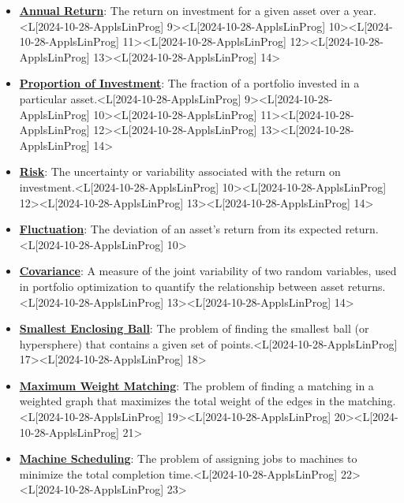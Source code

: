 \documentclass{article}%
\begin{document}
\begin{itemize}[[leftmargin=*]]
\item \href{https://www.math.purdue.edu/~yipn/421/2024-10-28-ApplsLinProg.pdf#page=9}{\textbf{Annual Return}}: The return on investment for a given asset over a year.<L[2024-10-28-ApplsLinProg] 9><L[2024-10-28-ApplsLinProg] 10><L[2024-10-28-ApplsLinProg] 11><L[2024-10-28-ApplsLinProg] 12><L[2024-10-28-ApplsLinProg] 13><L[2024-10-28-ApplsLinProg] 14>%
\item \href{https://www.math.purdue.edu/~yipn/421/2024-10-28-ApplsLinProg.pdf#page=9}{\textbf{Proportion of Investment}}: The fraction of a portfolio invested in a particular asset.<L[2024-10-28-ApplsLinProg] 9><L[2024-10-28-ApplsLinProg] 10><L[2024-10-28-ApplsLinProg] 11><L[2024-10-28-ApplsLinProg] 12><L[2024-10-28-ApplsLinProg] 13><L[2024-10-28-ApplsLinProg] 14>%
\item \href{https://www.math.purdue.edu/~yipn/421/2024-10-28-ApplsLinProg.pdf#page=10}{\textbf{Risk}}: The uncertainty or variability associated with the return on investment.<L[2024-10-28-ApplsLinProg] 10><L[2024-10-28-ApplsLinProg] 12><L[2024-10-28-ApplsLinProg] 13><L[2024-10-28-ApplsLinProg] 14>%
\item \href{https://www.math.purdue.edu/~yipn/421/2024-10-28-ApplsLinProg.pdf#page=10}{\textbf{Fluctuation}}: The deviation of an asset's return from its expected return.<L[2024-10-28-ApplsLinProg] 10>%
\item \href{https://www.math.purdue.edu/~yipn/421/2024-10-28-ApplsLinProg.pdf#page=13}{\textbf{Covariance}}: A measure of the joint variability of two random variables, used in portfolio optimization to quantify the relationship between asset returns.<L[2024-10-28-ApplsLinProg] 13><L[2024-10-28-ApplsLinProg] 14>%
\item \href{https://www.math.purdue.edu/~yipn/421/2024-10-28-ApplsLinProg.pdf#page=17}{\textbf{Smallest Enclosing Ball}}: The problem of finding the smallest ball (or hypersphere) that contains a given set of points.<L[2024-10-28-ApplsLinProg] 17><L[2024-10-28-ApplsLinProg] 18>%
\item \href{https://www.math.purdue.edu/~yipn/421/2024-10-28-ApplsLinProg.pdf#page=19}{\textbf{Maximum Weight Matching}}: The problem of finding a matching in a weighted graph that maximizes the total weight of the edges in the matching.<L[2024-10-28-ApplsLinProg] 19><L[2024-10-28-ApplsLinProg] 20><L[2024-10-28-ApplsLinProg] 21>%
\item \href{https://www.math.purdue.edu/~yipn/421/2024-10-28-ApplsLinProg.pdf#page=22}{\textbf{Machine Scheduling}}: The problem of assigning jobs to machines to minimize the total completion time.<L[2024-10-28-ApplsLinProg] 22><L[2024-10-28-ApplsLinProg] 23>%

\end{itemize}
\end{document}
